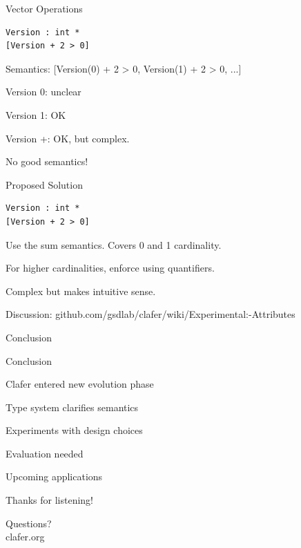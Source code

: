 \documentclass[table,15pt,t]{beamer}
\newcommand{\vmiddle}[1]{
  \vspace{\stretch{1}}
  #1
  \vspace{\stretch{1}}
}
\newcommand{\interframe}[1]{
\begin{frame}{}
\vmiddle{\hmiddle{\Huge #1}}
\end{frame}
}
\newcommand{\mlist}[1]{
\vmiddle{
  \begin{list}{}{}
    #1
  \end{list}
  }
}
\newcommand{\hmiddle}[1]{
  \begin{center}#1\end{center}
}
\begin{document}
\begin{frame}[fragile,c]{Vector Operations}
\begin{lstlisting}
Version : int *
[Version + 2 > 0]
\end{lstlisting}
\begin{list}{}{}
    \item Semantics: [Version(0) + 2 > 0, Version(1) + 2 > 0, ...]\pause
    \item Version 0: unclear
    \item Version 1: OK
    \item Version +: OK, but complex.
\end{list}
\end{frame}

\interframe{No good semantics!}

\begin{frame}[fragile,c]{Proposed Solution}
\begin{lstlisting}
Version : int *
[Version + 2 > 0]
\end{lstlisting}
\begin{list}{}{}
    \item Use the sum semantics. Covers 0 and 1 cardinality.
    \item For higher cardinalities, enforce using quantifiers.
    \item Complex but makes intuitive sense.
    \item Discussion: github.com/gsdlab/clafer/wiki/Experimental:-Attributes
\end{list}
\end{frame}

\interframe{Conclusion}

\begin{frame}{Conclusion}
 \mlist{
    \item Clafer entered new evolution phase
    \item Type system clarifies semantics
    \item Experiments with design choices
    \item Evaluation needed
    \item Upcoming applications
 }
\end{frame}

\interframe{Thanks for listening!}

\interframe{Questions?\\[1cm]\normalsize{\textsf{clafer.org}}}
\end{document}
